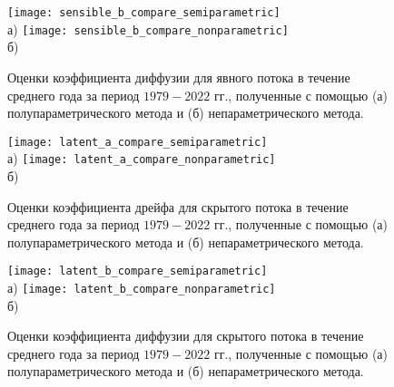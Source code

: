\begin{figure}[!h]
	\centering
	\texttt{[image: sensible\_b\_compare\_semiparametric]}\\
	а)
	\texttt{[image: sensible\_b\_compare\_nonparametric]}\\
	б)
	\caption{Оценки коэффициента диффузии для явного потока в течение среднего года за период $1979-2022$ гг., полученные с помощью (а) полупараметрического метода и (б) непараметрического метода.} 
	\label{fig:sensible_compare_b}
\end{figure}

\begin{figure}[!h]
	\centering
	\texttt{[image: latent\_a\_compare\_semiparametric]}\\
	а)
	\texttt{[image: latent\_a\_compare\_nonparametric]}\\
	б)
	\caption{Оценки коэффициента дрейфа для скрытого потока в течение среднего года за период $1979-2022$ гг., полученные с помощью (а) полупараметрического метода и (б) непараметрического метода.} 
	\label{fig:latent_compare_a}
\end{figure}


\begin{figure}[!h]
	\centering
	\texttt{[image: latent\_b\_compare\_semiparametric]}\\
	а)
	\texttt{[image: latent\_b\_compare\_nonparametric]}\\
	б)
	\caption{Оценки коэффициента диффузии для скрытого потока в течение среднего года за период $1979-2022$ гг., полученные с помощью (а) полупараметрического метода и (б) непараметрического метода.} 
	\label{fig:latent_compare_b}
\end{figure}


